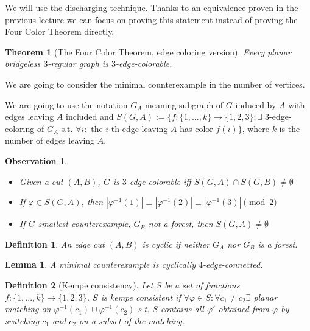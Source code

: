 \documentclass{article}
\newtheorem*{theorem}{Theorem}
\newtheorem*{definition}{Definition}
\newtheorem*{lemma}{Lemma}
\newtheorem*{observation}{Observation}
\begin{document}
We will use the discharging technique. Thanks to an equivalence proven in the
previous lecture we can focus on proving this statement instead of proving the
Four Color Theorem directly.

\begin{theorem}[The Four Color Theorem, edge coloring version]
	Every planar bridgeless $3$-regular graph is $3$-edge-colorable.
\end{theorem}

\noindent
We are going to consider the minimal counterexample in the number of vertices.

We are going to use the notation $G_A$ meaning subgraph of $G$ induced by $A$
with edges leaving $A$ included and $S(G, A) := \{ f: \{1,...,k\} \rightarrow
\{1,2,3\}: \exists$ $3$-edge-coloring of $G_A$ s.t. $\forall i:$ the $i$-th
edge leaving $A$ has color $f(i) \}$, where $k$ is the number of edges leaving
$A$.

\begin{observation}
	~
	\begin{itemize}
		\item Given a cut $(A,B)$, $G$ is $3$-edge-colorable iff
			$S(G,A) \cap S(G,B) \neq \emptyset$
		\item If $\varphi \in S(G,A)$, then
			$|\varphi^{-1}(1)| \equiv |\varphi^{-1}(2)|
			\equiv |\varphi^{-1}(3)| \pmod{2}$
		\item If $G$ smallest counterexample, $G_B$ not a forest, then
			$S(G,A) \neq \emptyset$
	\end{itemize}
\end{observation}

\begin{definition}
	An edge cut $(A, B)$ is \emph{cyclic} if neither $G_A$ nor $G_B$ is a
	forest.
\end{definition}

\begin{lemma}
	A minimal counterexample is cyclically $4$-edge-connected.
\end{lemma}

\begin{definition}[Kempe consistency]
	Let $S$ be a set of functions $f: \{1,...,k\} \rightarrow \{1,2,3\}$.
	$S$ is \emph{kempe consistent} if
	$\forall \varphi \in S: \forall c_1 \neq c_2 \exists$ planar matching
	on $\varphi^{-1}(c_1) \cup \varphi^{-1}(c_2)$ s.t. $S$ contains all
	$\varphi'$ obtained from $\varphi$ by switching $c_1$ and $c_2$ on a
	subset of the matching.
\end{definition}
\end{document}
